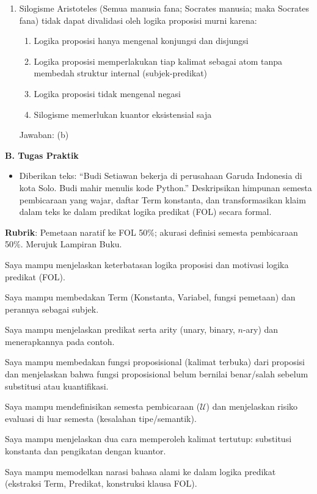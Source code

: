 \documentclass[../main]{subfiles}
\begin{document}
\begin{asesmen}
\begin{enumerate}
  \item Silogisme Aristoteles (Semua manusia fana; Socrates manusia; maka Socrates fana) tidak dapat divalidasi oleh logika proposisi murni karena:
  \begin{enumerate}
    \item Logika proposisi hanya mengenal konjungsi dan disjungsi
    \item Logika proposisi memperlakukan tiap kalimat sebagai atom tanpa membedah struktur internal (subjek-predikat)
    \item Logika proposisi tidak mengenal negasi
    \item Silogisme memerlukan kuantor eksistensial saja
  \end{enumerate}
  Jawaban: (b)
\end{enumerate}

\textbf{B. Tugas Praktik}
\begin{itemize}
  \item Diberikan teks: ``Budi Setiawan bekerja di perusahaan Garuda Indonesia di kota Solo. Budi mahir menulis kode Python.'' Deskripsikan himpunan semesta pembicaraan yang wajar, daftar Term konstanta, dan transformasikan klaim dalam teks ke dalam predikat logika predikat (FOL) secara formal.
\end{itemize}

\textbf{Rubrik}: Pemetaan naratif ke FOL 50\%; akurasi definisi semesta pembicaraan 50\%. Merujuk Lampiran Buku.
\end{asesmen}


\begin{checklist}
  \item Saya mampu menjelaskan keterbatasan logika proposisi dan motivasi logika predikat (FOL).
  \item Saya mampu membedakan Term (Konstanta, Variabel, fungsi pemetaan) dan perannya sebagai subjek.
  \item Saya mampu menjelaskan predikat serta arity (unary, binary, $n$-ary) dan menerapkannya pada contoh.
  \item Saya mampu membedakan fungsi proposisional (kalimat terbuka) dari proposisi dan menjelaskan bahwa fungsi proposisional belum bernilai benar/salah sebelum substitusi atau kuantifikasi.
  \item Saya mampu mendefinisikan semesta pembicaraan ($\mathcal{U}$) dan menjelaskan risiko evaluasi di luar semesta (kesalahan tipe/semantik).
  \item Saya mampu menjelaskan dua cara memperoleh kalimat tertutup: substitusi konstanta dan pengikatan dengan kuantor.
  \item Saya mampu memodelkan narasi bahasa alami ke dalam logika predikat (ekstraksi Term, Predikat, konstruksi klausa FOL).
\end{checklist}
\end{document}
